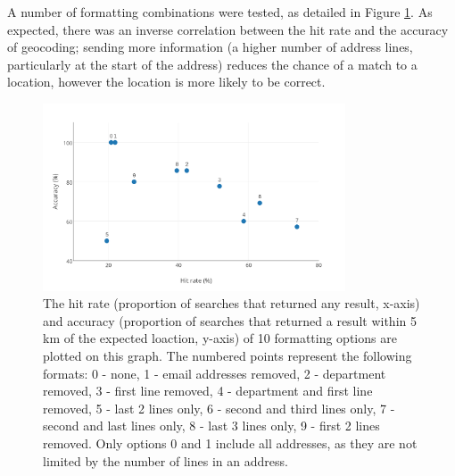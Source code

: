\documentclass[Report.tex]{subfiles}
\begin{document}
\noindent A number of formatting combinations were tested, as detailed in Figure \ref{fig:geoscatter}. As expected, there was an inverse correlation between the hit rate and the accuracy of geocoding; sending more information (a higher number of address lines, particularly at the start of the address) reduces the chance of a match to a location, however the location is more likely to be correct.\newline

\begin{figure}[!ht]
\begin{center}
	\includegraphics[width=0.8\textwidth]{../lib/images/geocode_performance_scatter}
	\caption{The hit rate (proportion of searches that returned any result, x-axis) and accuracy (proportion of searches that returned a result within 5 km of the expected loaction, y-axis) of 10 formatting options are plotted on this graph. The numbered points represent the following formats: 0 - none, 1 - email addresses removed, 2 - department removed, 3 - first line removed, 4 - department and first line removed, 5 - last 2 lines only, 6 - second and third lines only, 7 - second and last lines only, 8 - last 3 lines only, 9 - first 2 lines removed. Only options 0 and 1 include all addresses, as they are not limited by the number of lines in an address. \label{fig:geoscatter}}
\end{center}
\end{figure}
\end{document}
